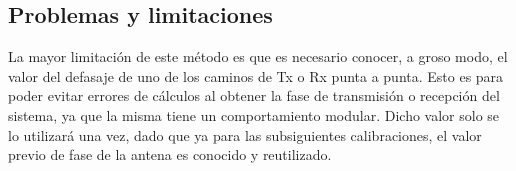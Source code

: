 \subsection{Problemas y limitaciones}

La mayor limitación de este método es que es necesario conocer, a groso modo, el valor del defasaje de uno de los caminos de 
Tx o Rx punta a punta. Esto es para poder evitar errores de cálculos al obtener la fase de transmisión o recepción del 
sistema, ya que la misma tiene un comportamiento modular. Dicho valor solo se lo utilizará una vez, dado que ya para las 
subsiguientes calibraciones, el valor previo de fase de la antena es conocido y reutilizado.

